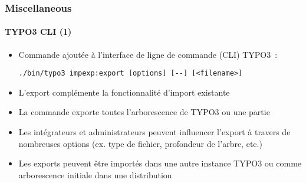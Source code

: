 %

\begin{frame}[fragile]
	\frametitle{Miscellaneous}
	\framesubtitle{TYPO3 CLI (1)}


	\begin{itemize}
		\item Commande ajoutée à l'interface de ligne de commande (CLI) TYPO3~:
\begin{lstlisting}
./bin/typo3 impexp:export [options] [--] [<filename>]
\end{lstlisting}
		\item L'export complémente la fonctionnalité d'import existante
		\item La commande exporte toutes l'arborescence de TYPO3 ou une partie
		\item Les intégrateurs et administrateurs peuvent influencer l'export à travers
			de nombreuses options (ex. type de fichier, profondeur de l'arbre, etc.)
		\item Les exports peuvent être importés dans une autre instance TYPO3 ou
			comme arborescence initiale dans une distribution
	\end{itemize}

\end{frame}


